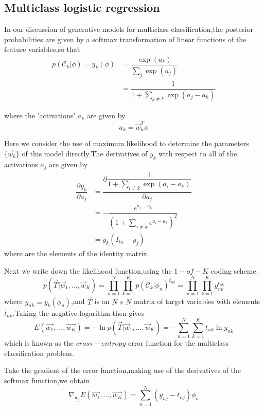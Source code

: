 \subsection{Multiclass logistic regression}
In our discussion of generative models for multiclass classification,the posterior probabilities are given by a softmax transformation of linear functions of the feature variables,so that
\begin{align}
p(\mathcal{C}_k|\phi) = y_k(\phi) &= \dfrac{\exp(a_k)}{\sum_j\exp(a_j)}\\
&=\dfrac{1}{1+\sum_{j\neq k}\exp(a_j-a_k)}
\end{align}

where the 'activations' $a_k$ are given by
\begin{equation}
a_k = \vec{w}_k^T\phi
\end{equation}
	
Here we consider the use of maximum likelihood to determine the parameters $\{\vec{w}_k\}$ of this model directly.The derivatives of $y_k$ with respect to all of the activations $a_j$ are given by 
\begin{align}
\dfrac{\partial y_k}{\partial a_j} 
&=\dfrac{\partial\dfrac{1}{1+\sum_{i\neq k}\exp(a_i-a_k)}}{\partial a_j}\\
&=-\dfrac{e^{a_i-a_k}}{(1+\sum_{i\neq k}e^{a_i-a_k})^2}\\	
&=y_k(I_{kj}-y_j)
\end{align}
where  are the elements of the identity matrix.

Next we write down the likelihood function,using the $1-of-K$ coding scheme.
\begin{equation}
p(\vec{T}|\vec{w}_1,...,\vec{w}_K)=
\prod_{n=1}^{N}\prod_{k=1}^{K}p(\mathcal{C}_k|\phi_n)^{t_{nk}}
=\prod_{n=1}^{N}\prod_{k=1}^{K}y_{nk}^{t_{nk}}
\end{equation}
where $y_{nk}=y_k(\phi_n)$,and $\vec{T}$ is an $N\times N$ matrix of target variables with elements $t_{nk}$.Taking the negative logarithm then gives
\begin{equation}
E(\vec{w_1},...,\vec{w_K})=-\ln p(\vec{T}|\vec{w}_1,...,\vec{w}_K)
=-\sum_{n=1}^{N}\sum_{k=1}^{K}t_{nk}\ln y_{nk}
\end{equation}
which is known as the $cross-entropy$ error function for the multiclass classification problem.

Take the gradient of the error function,making use of the derivatives of the softmax function,we obtain
\begin{equation}
\nabla_{w_j}E(\vec{w_1},...,\vec{w_K}) =
\sum_{n=1}^{N}(y_{nj}-t_{nj})\phi_n
\end{equation}

